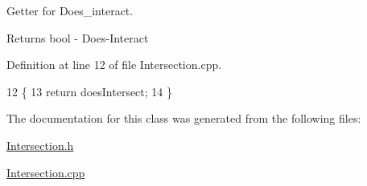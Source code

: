 Getter for Does\+\_\+interact. 

\begin{DoxyReturn}{Returns}
bool -\/ Does-\/\+Interact 
\end{DoxyReturn}


Definition at line 12 of file Intersection.\+cpp.


\begin{DoxyCode}
12                                   \{
13     \textcolor{keywordflow}{return} doesIntersect;
14 \}
\end{DoxyCode}


The documentation for this class was generated from the following files\+:\begin{DoxyCompactItemize}
\item 
\hyperlink{_intersection_8h}{Intersection.\+h}\item 
\hyperlink{_intersection_8cpp}{Intersection.\+cpp}\end{DoxyCompactItemize}
